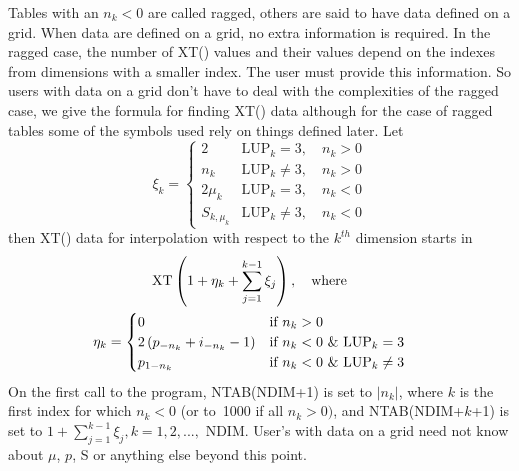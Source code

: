 \documentclass[twoside]{MATH77}
\begin{document}
Tables with an $n_k<0$ are called ragged, others are said to have data
defined on a grid. When data are defined on a grid, no extra information is
required. In the ragged case, the number of XT() values and their values
depend on the indexes from dimensions with a smaller index. The user must
provide this information. So users with data on a grid don't have to deal
with the complexities of the ragged case, we give the formula for finding XT()
data although for the case of ragged tables some of the symbols used rely on
things defined later. Let
\begin{equation}
\label{O1}\xi _k=
\begin{cases}
 2 & \text{LUP}_k=3,\quad n_k>0\\
n_k &\text{LUP}_k\neq 3,\quad n_k>0\\
2\mu _k & \text{LUP}_k=3,\quad n_k<0\\
S_{k,\mu _k} & \text{LUP}_k\neq 3,\quad n_k<0
\end{cases}
\end{equation}
then XT() data for interpolation with respect to the $k^{th}$ dimension starts
in
\begin{gather}\label{O2}
\hspace{-15pt}\text{XT}\left( 1+\eta _k+\sum_{j=1}^{k-1}\xi _j\right) ,
\quad \text{where}\\
\label{O3} \hspace{-15pt}\eta _k=
\begin{cases}
0 &\text{if }n_k>0\\
2\left(p_{-n_k}+i_{-n_k}-1\right) & \text{if }n_k<0\text{ \& LUP}_k=3\\
p_{1-n_k} & \text{if }n_k<0\text{ \& LUP}_k\neq 3
\end{cases}
\end{gather}
On the first call to the program, NTAB(NDIM+1) is set to $|n_k|$, where $k$
is the first index for which $n_k<0$ (or to~1000 if all $n_k>0)$, and
NTAB(NDIM+$k$+1) is set to $1+\sum_{j=1}^{k-1}\xi _j,k=1,2,...,$ NDIM. User's
with data on a grid need not know about $\mu $, $p$, S or anything else
beyond this point.
\end{document}
